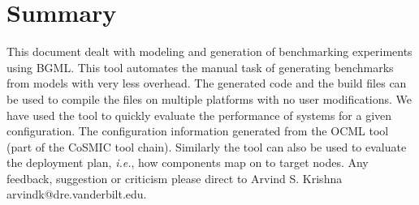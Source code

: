 \documentclass[onecolumn]{article}
\begin{document}
\section* {Summary}
This document dealt with modeling and generation of benchmarking
experiments using BGML. This tool automates the manual task of
generating benchmarks from models with very less overhead. The
generated code and the build files can be used to compile the files on
multiple platforms with no user modifications. We have used the tool
to quickly evaluate the performance of systems for a given configuration.
The configuration information generated from the OCML tool (part of the
CoSMIC tool chain). Similarly the tool can also be used to evaluate the
deployment plan, {\em i.e.}, how components map on to target nodes. Any
feedback, suggestion or criticism please direct to
Arvind S. Krishna arvindk@dre.vanderbilt.edu.
\end{document}
